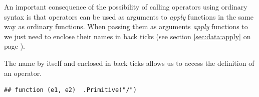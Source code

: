 \documentclass[krantz2]{krantz}\usepackage{knitr}%
\begin{document}
An important consequence of the possibility of calling operators using ordinary syntax is that operators can be used as arguments to \emph{apply} functions in the same way as ordinary functions. When passing them as arguments \emph{apply} functions to we just need to enclose their names in back ticks (see section \ref{sec:data:apply} on page \pageref{sec:data:apply}).

The name by itself and enclosed in back ticks allows us to access the definition of an operator.

\begin{knitrout}\footnotesize
{}\color{fgcolor}\begin{kframe}
\begin{alltt}
\end{alltt}
\begin{verbatim}
## function (e1, e2)  .Primitive("/")
\end{verbatim}
\end{kframe}
\end{knitrout}
\end{document}

